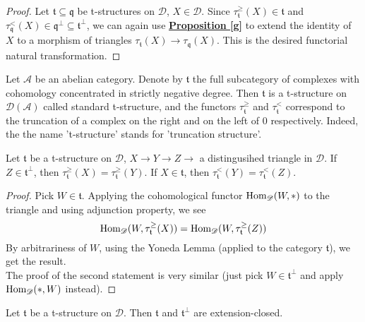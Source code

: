 \begin{proof}
Let $\mathfrak{t} \subseteq \mathfrak{q}$ be t-structures on $\mathscr{D}$, $X \in \mathscr{D}$. Since $\tau^{\ge}_{\mathfrak{t}}(X) \in \mathfrak{t}$ and $\tau^{<}_{\mathfrak{q}}(X) \in \mathfrak{q}^{\perp} \subseteq \mathfrak{t}^{\perp}$, we can again use \hyperref[g]{\textbf{Proposition \ref*{g}}} to extend the identity of $X$ to a morphism of triangles $\tau_{\mathfrak{t}}(X) \longrightarrow \tau_{\mathfrak{q}}(X)$. This is the desired functorial natural transformation. 
\end{proof}

\begin{exmp}\label{bbt}
Let $\mathscr{A}$ be an abelian category. Denote by $\mathfrak{t}$ the full subcategory of complexes with cohomology concentrated in strictly negative degree. Then $\mathfrak{t}$ is a t-structure on $\mathscr{D}(\mathscr{A})$ called standard t-structure, and the functors $\tau_{\mathfrak{t}}^{\ge}$ and $\tau_{\mathfrak{t}}^{<}$ correspond to the truncation of a complex on the right and on the left of $0$ respectively. Indeed, the the name 't-structure' stands for 'truncation structure'. 
\end{exmp}

\begin{prop}\label{m}
Let $\mathfrak{t}$ be a t-structure on $\mathscr{D}$, $X \longrightarrow Y \longrightarrow Z \longrightarrow $ a distingusihed triangle in $\mathscr{D}$. If $Z \in \mathfrak{t}^{\perp}$, then $\tau^{\ge}_{\mathfrak{t}}(X)=\tau^{\ge}_{\mathfrak{t}}(Y)$. If $X \in \mathfrak{t}$, then $\tau^{<}_{\mathfrak{t}}(Y)=\tau^{<}_{\mathfrak{t}}(Z)$.
\end{prop}

\begin{proof}
Pick $W \in \mathfrak{t}$. Applying the cohomological functor $\textnormal{Hom}_{\mathscr{D}}(W,*)$ to the triangle and using adjunction property, we see $$\textnormal{Hom}_{\mathscr{D}}(W,\tau^{\ge}_{\mathfrak{t}}(X))=\textnormal{Hom}_{\mathscr{D}}(W,\tau^{\ge}_{\mathfrak{t}}(Z))$$
By arbitrariness of $W$, using the Yoneda Lemma (applied to the category $\mathfrak{t}$), we get the result. \\
The proof of the second statement is very similar (just pick $W \in  \mathfrak{t}^{\perp}$ and apply $\textnormal{Hom}_{\mathscr{D}}(*,W)$ instead).
\end{proof}

\begin{prop}
Let $\mathfrak{t}$ be a t-structure on $\mathscr{D}$. Then $\mathfrak{t}$ and $\mathfrak{t}^{\perp}$ are extension-closed. 
\end{prop}

